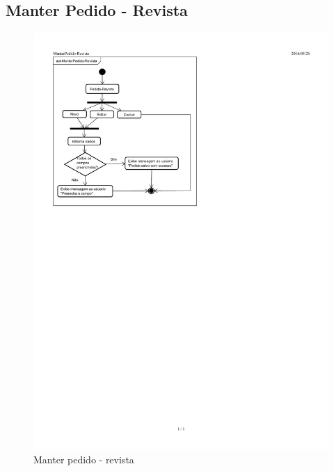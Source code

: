 \documentclass[chapter=TITLE,12pt,oneside,a4paper,english,french,sumario=tradicional,spanish,brazil,]{abntex2}
\begin{document}
\subsection{Manter Pedido - Revista}
\begin{figure}[h]\centering
	\includegraphics[scale=1.67]{pedido-revista.pdf}\caption{Manter pedido - revista}
\end{figure}


\newpage
\end{document}
